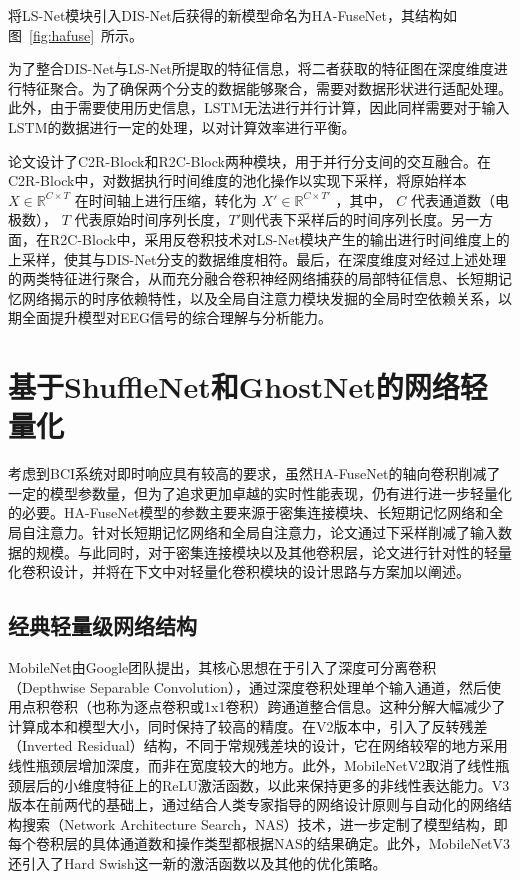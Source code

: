 将LS-Net模块引入DIS-Net后获得的新模型命名为HA-FuseNet，其结构如图~\ref{fig:hafuse}~所示。

为了整合DIS-Net与LS-Net所提取的特征信息，将二者获取的特征图在深度维度进行特征聚合。为了确保两个分支的数据能够聚合，需要对数据形状进行适配处理。此外，由于需要使用历史信息，LSTM无法进行并行计算，因此同样需要对于输入LSTM的数据进行一定的处理，以对计算效率进行平衡。

论文设计了C2R-Block和R2C-Block两种模块，用于并行分支间的交互融合。在C2R-Block中，对数据执行时间维度的池化操作以实现下采样，将原始样本 \(X \in \mathbb{R}^{C \times T}\) 在时间轴上进行压缩，转化为 \(X' \in \mathbb{R}^{C \times T'}\) ，其中， \(C\) 代表通道数（电极数）， \(T\) 代表原始时间序列长度，\(T'\)则代表下采样后的时间序列长度。另一方面，在R2C-Block中，采用反卷积技术对LS-Net模块产生的输出进行时间维度上的上采样，使其与DIS-Net分支的数据维度相符。最后，在深度维度对经过上述处理的两类特征进行聚合，从而充分融合卷积神经网络捕获的局部特征信息、长短期记忆网络揭示的时序依赖特性，以及全局自注意力模块发掘的全局时空依赖关系，以期全面提升模型对EEG信号的综合理解与分析能力。

\section{基于ShuffleNet和GhostNet的网络轻量化}

考虑到BCI系统对即时响应具有较高的要求，虽然HA-FuseNet的轴向卷积削减了一定的模型参数量，但为了追求更加卓越的实时性能表现，仍有进行进一步轻量化的必要。HA-FuseNet模型的参数主要来源于密集连接模块、长短期记忆网络和全局自注意力。针对长短期记忆网络和全局自注意力，论文通过下采样削减了输入数据的规模。与此同时，对于密集连接模块以及其他卷积层，论文进行针对性的轻量化卷积设计，并将在下文中对轻量化卷积模块的设计思路与方案加以阐述。

\subsection{经典轻量级网络结构}

MobileNet\cite{howard2017mobilenets}由Google团队提出，其核心思想在于引入了深度可分离卷积（Depthwise Separable Convolution），通过深度卷积处理单个输入通道，然后使用点积卷积（也称为逐点卷积或1x1卷积）跨通道整合信息。这种分解大幅减少了计算成本和模型大小，同时保持了较高的精度。在V2版本中，引入了反转残差（Inverted Residual）结构\cite{sandler2018mobilenetv2}，不同于常规残差块的设计，它在网络较窄的地方采用线性瓶颈层增加深度，而非在宽度较大的地方。此外，MobileNetV2取消了线性瓶颈层后的小维度特征上的ReLU激活函数，以此来保持更多的非线性表达能力。V3版本在前两代的基础上，通过结合人类专家指导的网络设计原则与自动化的网络结构搜索（Network Architecture Search，NAS）技术\cite{howard2019searching}，进一步定制了模型结构，即每个卷积层的具体通道数和操作类型都根据NAS的结果确定。此外，MobileNetV3还引入了Hard Swish这一新的激活函数以及其他的优化策略。

